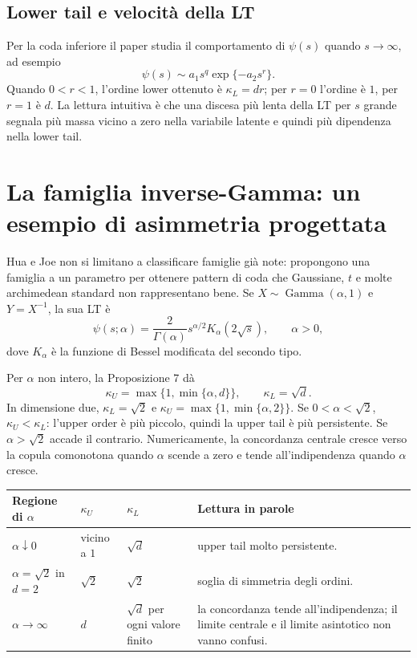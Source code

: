 \documentclass[11pt,a4paper]{article}
\begin{document}
\subsection{Lower tail e velocità della LT}
Per la coda inferiore il paper studia il comportamento di $\psi(s)$ quando
$s\to\infty$, ad esempio
\[
 \psi(s)\sim a_1s^q\exp\{-a_2s^r\}.
\]
Quando $0<r<1$, l'ordine lower ottenuto è $\kappa_L=dr$; per $r=0$ l'ordine
è $1$, per $r=1$ è $d$. La lettura intuitiva è che una discesa più lenta della
LT per $s$ grande segnala più massa vicino a zero nella variabile latente e
quindi più dipendenza nella lower tail.

\section{La famiglia inverse-Gamma: un esempio di asimmetria progettata}

Hua e Joe non si limitano a classificare famiglie già note: propongono una
famiglia a un parametro per ottenere pattern di coda che Gaussiane, $t$ e
molte archimedean standard non rappresentano bene. Se
$X\sim\operatorname{Gamma}(\alpha,1)$ e $Y=X^{-1}$, la sua LT è
\begin{equation}
 \psi(s;\alpha)=\frac{2}{\Gamma(\alpha)}s^{\alpha/2}
 K_\alpha(2\sqrt{s}),\qquad \alpha>0,
 \label{eq:inverse-gamma-lt}
\end{equation}
dove $K_\alpha$ è la funzione di Bessel modificata del secondo tipo.

Per $\alpha$ non intero, la Proposizione 7 dà
\begin{equation}
 \kappa_U=\max\{1,\min\{\alpha,d\}\},
 \qquad \kappa_L=\sqrt d.
 \label{eq:inverse-gamma-orders}
\end{equation}
In dimensione due, $\kappa_L=\sqrt2$ e
$\kappa_U=\max\{1,\min\{\alpha,2\}\}$. Se $0<\alpha<\sqrt2$,
$\kappa_U<\kappa_L$: l'upper order è più piccolo, quindi la upper tail è più
persistente. Se $\alpha>\sqrt2$ accade il contrario. Numericamente, la
concordanza centrale cresce verso la copula comonotona quando $\alpha$ scende
a zero e tende all'indipendenza quando $\alpha$ cresce.

\begin{center}
\begin{tabular}{p{3.2cm}p{2.7cm}p{2.7cm}p{4.2cm}}
\toprule
Regione di $\alpha$ & $\kappa_U$ & $\kappa_L$ & Lettura in parole\\
\midrule
$\alpha\downarrow0$ & vicino a $1$ & $\sqrt d$ & upper tail molto persistente.\\
$\alpha=\sqrt2$ in $d=2$ & $\sqrt2$ & $\sqrt2$ & soglia di simmetria degli ordini.\\
$\alpha\to\infty$ & $d$ & $\sqrt d$ per ogni valore finito & la concordanza tende all'indipendenza; il limite centrale e il limite asintotico non vanno confusi.\\
\bottomrule
\end{tabular}
\end{center}
\end{document}
